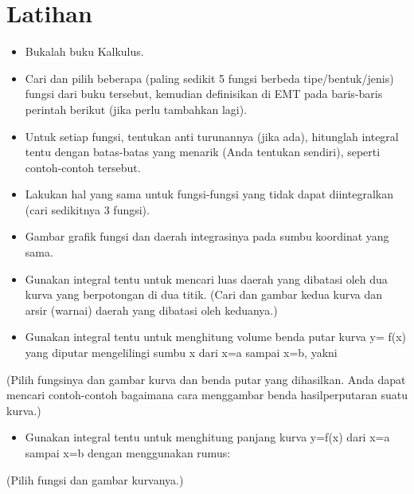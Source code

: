 \documentclass[
]{book}
\providecommand{\tightlist}{%
  \setlength{\itemsep}{0pt}\setlength{\parskip}{0pt}}
\begin{document}
\section{Latihan}\label{latihan-2}

\begin{itemize}
\tightlist
\item
  Bukalah buku Kalkulus.
\item
  Cari dan pilih beberapa (paling sedikit 5 fungsi berbeda tipe/bentuk/jenis) fungsi dari buku tersebut, kemudian definisikan di EMT pada baris-baris perintah berikut (jika perlu tambahkan lagi).
\item
  Untuk setiap fungsi, tentukan anti turunannya (jika ada), hitunglah integral tentu dengan batas-batas yang menarik (Anda tentukan sendiri), seperti contoh-contoh tersebut.
\item
  Lakukan hal yang sama untuk fungsi-fungsi yang tidak dapat diintegralkan (cari sedikitnya 3 fungsi).
\item
  Gambar grafik fungsi dan daerah integrasinya pada sumbu koordinat yang sama.
\item
  Gunakan integral tentu untuk mencari luas daerah yang dibatasi oleh dua kurva yang berpotongan di dua titik. (Cari dan gambar kedua kurva dan arsir (warnai) daerah yang dibatasi oleh keduanya.)
\item
  Gunakan integral tentu untuk menghitung volume benda putar kurva y= f(x) yang diputar mengelilingi sumbu x dari x=a sampai x=b, yakni
\end{itemize}

(Pilih fungsinya dan gambar kurva dan benda putar yang dihasilkan. Anda dapat mencari contoh-contoh bagaimana cara menggambar benda hasilperputaran suatu kurva.)

\begin{itemize}
\tightlist
\item
  Gunakan integral tentu untuk menghitung panjang kurva y=f(x) dari x=a sampai x=b dengan menggunakan rumus:
\end{itemize}

(Pilih fungsi dan gambar kurvanya.)
\end{document}
